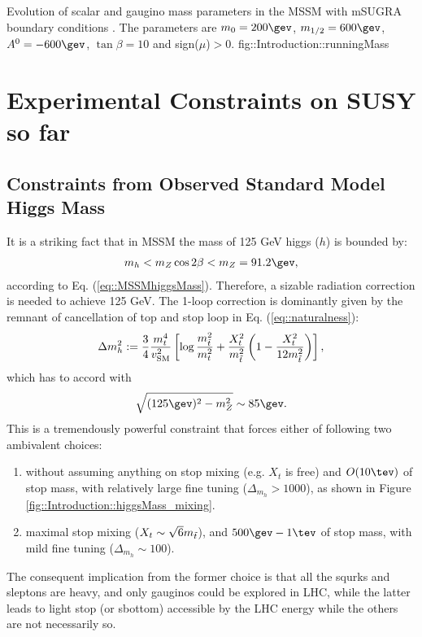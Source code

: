 {Evolution of scalar and gaugino mass parameters in the MSSM with mSUGRA boundary conditions \cite{SUSYPrimer}. The parameters are $m_0=200 \gev$, $m_{1/2}=600 \gev$, $A^0=-600\gev$, $\tan{\beta}=10$ and sign($\mu$)$>0$.}
{fig::Introduction::runningMass}


\section{Experimental Constraints on SUSY so far}  \label{sec::Introduction::ExpConst}
\subsection{Constraints from Observed Standard Model Higgs Mass}
It is a striking fact that in MSSM the mass of 125 GeV higgs ($h$) is bounded by:
\begin{align}
m_{h} < m_Z \cos{2\beta} < m_Z = 91.2 \gev,
\end{align}
according to Eq. (\ref{eq::MSSMhiggsMass}).
Therefore, a sizable radiation correction is needed to achieve 125 GeV.
The 1-loop correction is dominantly given by the remnant of cancellation of top and stop loop in Eq. (\ref{eq::naturalness}):
\begin{align}
\Delta m_h^2 := \frac{3}{4} \frac{m_t^4}{v_{\mathrm{SM}}^2} \left[ \log{\frac{m_{\tilde{t}}^2}{m_t^2}} + \frac{X_t^2}{m_{\tilde{t}}^2} \left(1-\frac{X_t^2}{12m_{\tilde{t}}^2} \right)  \right],
\end{align}
which has to accord with 
\begin{align}
\sqrt{(125\gev)^2 - m_Z^2} \sim 85\gev.
\end{align}
This is a tremendously powerful constraint that forces either of following two ambivalent choices:
\begin{enumerate}
\item without assuming anything on stop mixing (e.g. $X_t$ is free) and $O(10\tev)$ of stop mass, with relatively large fine tuning ($\Delta_{m_{h}}>1000$), as shown in Figure \ref{fig::Introduction::higgsMass_mixing}. 
\item maximal stop mixing ($X_t \sim \sqrt{6}m_{\tilde{t}}$), and $500\gev-1\tev$ of stop mass, with mild fine tuning ($\Delta_{m_{h}} \sim 100$).
\end{enumerate}
The consequent implication from the former choice is that all the squrks and sleptons are heavy, and only gauginos could be explored in LHC,
while the latter leads to light stop (or sbottom) accessible by the LHC energy while the others are not necessarily so. \\

